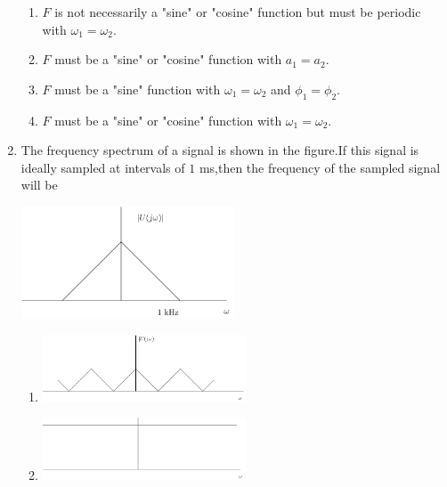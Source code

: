 \documentclass[journal,12pt,onecolumn]{IEEEtran}
\theoremstyle{remark}
\begin{document}
\begin{enumerate}
\begin{enumerate}
    \item$F$ is not necessarily a "sine" or "cosine" function but must be periodic with $\omega_1 = \omega_2$.
    \item $F$ must be a "sine" or "cosine" function with $a_1 = a_2$.
    \item $F$ must be a "sine" function with $\omega_1 = \omega_2$ and $\phi_1 = \phi_2$.
    \item $F$ must be a "sine" or "cosine" function with $\omega_1 = \omega_2$.\\
\end{enumerate}
\item The frequency spectrum of a signal is shown in the figure.If this signal is ideally sampled at intervals of $1$ ms,then the frequency of the sampled signal will be
	 \begin{center}
\includegraphics[width=0.5\textwidth]{figs/fig8/Fig8.1/main} %
\end{center}
	
\begin{enumerate}
    \item	 \begin{center}
\includegraphics[width=0.5\textwidth]{figs/fig8/fig8.2/main} %
\end{center}
 
    \item 	 \begin{center}
\includegraphics[width=0.5\textwidth]{figs/fig8/fig8.3/main} %
\end{center}


\end{enumerate}
\end{enumerate}
\end{document}
